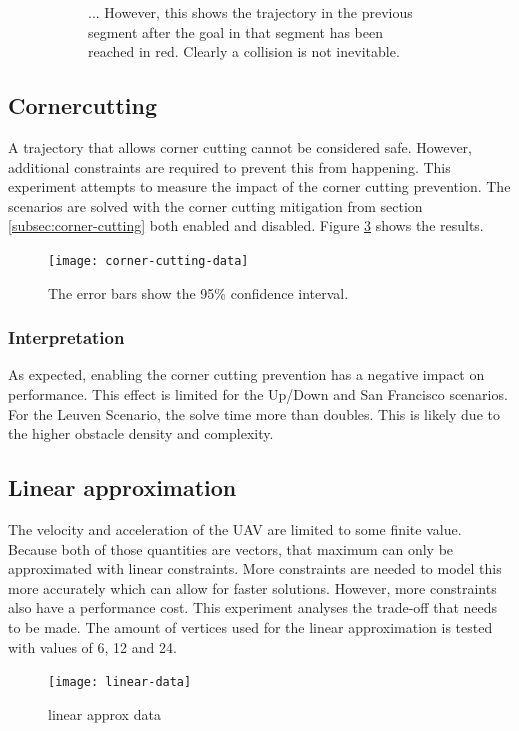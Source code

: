 \begin{figure}
\begin{subfigure}[t]{.45\textwidth}
        		\caption{... However, this shows the trajectory in the previous segment after the goal in that segment has been reached in red. Clearly a collision is not inevitable.}
        		\label{fig:leuven-fail-post}
	\end{subfigure}	
	
        
    \caption{}\label{fig:leuven-fail}
\end{figure}



\clearpage
\subsection{Cornercutting}
\label{subsec:cutting}
A trajectory that allows corner cutting cannot be considered safe. However, additional constraints are required to prevent this from happening. This experiment attempts to measure the impact of the corner cutting prevention. The scenarios are solved with the corner cutting mitigation from section \ref{subsec:corner-cutting} both enabled and disabled. Figure \ref{fig:corner-data} shows the results. 

\begin{figure}[]
	\centering
	\texttt{[image: corner-cutting-data]}
	\caption{The error bars show the 95\% confidence interval.}
	\label{fig:corner-data}
\end{figure}

\subsubsection{Interpretation}
As expected, enabling the corner cutting prevention has a negative impact on performance. This effect is limited for the Up/Down and San  Francisco scenarios. For the Leuven Scenario, the solve time more than doubles. This is likely due to the higher obstacle density and complexity.


\clearpage
\subsection{Linear approximation}
\label{subsec:lin-approx}
The velocity and acceleration of the UAV are limited to some finite value. Because both of those quantities are vectors, that maximum can only be approximated with linear constraints. More constraints are needed to model this more accurately which can allow for faster solutions. However, more constraints also have a performance cost. This experiment analyses the trade-off that needs to be made. The amount of vertices used for the linear approximation is tested with values of 6, 12 and 24.
\begin{figure}[]
	\centering
	\texttt{[image: linear-data]}
	\caption{linear approx data}
	\label{fig:linear-approx-data}
\end{figure}



